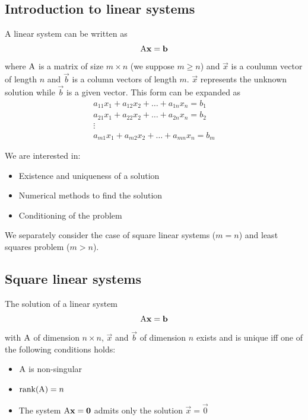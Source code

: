 \subsection{Introduction to linear systems}

A linear system can be written as
$$ \mathrm{A}\mathbf{x} = \mathbf{b} $$
where $\mathrm{A}$ is a matrix of size $m \times n$ (we suppose $m \geq n$) and $\vec{x}$ is a coulumn vector of length $n$ and $\vec{b}$ is a column vectors of length $m$. $\vec{x}$ represents the unknown solution while $\vec{b}$ is a given vector. This form can be expanded as
$$
    \begin{matrix}
        a_{11}x_1 + a_{12}x_2 + \hdots + a_{1n}x_n = b_1\\
        a_{21}x_1 + a_{22}x_2 + \hdots + a_{2n}x_n = b_2\\
        \vdots\\
        a_{m1}x_1 + a_{m2}x_2 + \hdots + a_{mn}x_n = b_m
    \end{matrix}
$$

We are interested in:

\begin{itemize}
    \item Existence and uniqueness of a solution
    \item Numerical methods to find the solution
    \item Conditioning of the problem
\end{itemize}

We separately consider the case of square linear systems ($m=n$) and least squares problem ($m>n$).

\subsection{Square linear systems}


\begin{proposition}
    The solution of a linear system
    $$ \mathrm{A}\mathbf{x} = \mathbf{b} $$
    with $\mathrm{A}$ of dimension $n \times n$, $\vec{x}$ and $\vec{b}$ of dimension $n$ exists and is unique iff one of the following conditions holds:
    
    \begin{itemize}
        \item $\mathrm{A}$ is non-singular
        \item $\mathrm{rank}(\mathrm{A}) = n$
           \item The system $\mathrm{A}\mathbf{x} = \mathbf{0}$ admits only the solution $\vec{x} = \vec{0}$
    \end{itemize}

\end{proposition}

